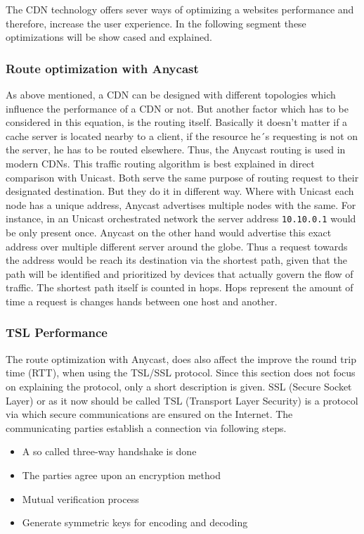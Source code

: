 The CDN technology offers sever ways of optimizing a websites performance and therefore, increase the user experience. In the following segment these optimizations will be show cased and explained.

\subsubsection{Route optimization with Anycast}

As above mentioned, a CDN can be designed with different topologies which influence the performance of a CDN or not. But another factor which has to be considered in this equation, is the routing itself. Basically it doesn't matter if a cache server is located nearby to a client, if the resource he´s requesting is not on the server, he has to be routed elsewhere. 
Thus, the Anycast routing is used in modern CDNs. This traffic routing algorithm is best explained in direct comparison with Unicast. Both serve the same purpose of routing request to their designated destination. But they do it in different way. Where with Unicast each node has a unique address, Anycast advertises multiple nodes with the same.
For instance, in an Unicast orchestrated network the server address \texttt{10.10.0.1} would be only present once. Anycast on the other hand would advertise this exact address over multiple different server around the globe. Thus a request towards the address would be reach its destination via the shortest path, given that the path will be identified and prioritized by devices that actually govern the flow of traffic.
The shortest path itself is counted in hops. Hops represent the amount of time a request is changes hands between one host and another.\cite{cdn_route_opt}

\subsubsection{TSL Performance}

The route optimization with Anycast, does also affect the improve the round trip time (RTT), when using the TSL/SSL protocol. Since this section does not focus on explaining the protocol, only a short description is given.
SSL (Secure Socket Layer) or as it now should be called TSL (Transport Layer Security) is a protocol via which secure communications are ensured on the Internet. The communicating parties establish a connection via following steps.

\begin{itemize}
	\item A so called three-way handshake is done
	\item The parties agree upon an encryption method
	\item Mutual verification process
	\item Generate symmetric keys for encoding and decoding	
\end{itemize}

